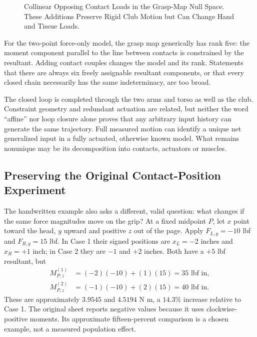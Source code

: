 \documentclass[11pt,a4paper]{article}
\newcommand{\vect}[1]{\boldsymbol{#1}}
\begin{document}
\begin{figure}[htbp]\centering
{}
\caption{Collinear Opposing Contact Loads in the Grasp-Map Null Space. These Additions Preserve Rigid Club Motion but Can Change Hand and Tissue Loads.}
\label{fig:distributed_forces}\end{figure}

For the two-point force-only model, the grasp map generically has rank five: the moment component parallel to the line between contacts is constrained by the resultant. Adding contact couples changes the model and its rank. Statements that there are always six freely assignable resultant components, or that every closed chain necessarily has the same indeterminacy, are too broad.

The closed loop is completed through the two arms and torso as well as the club. Constraint geometry and redundant actuation are related, but neither the word ``affine'' nor loop closure alone proves that any arbitrary input history can generate the same trajectory. Full measured motion can identify a unique net generalized input in a fully actuated, otherwise known model. What remains nonunique may be its decomposition into contacts, actuators or muscles.

\subsection{Preserving the Original Contact-Position Experiment}
The handwritten example also asks a different, valid question: what changes if the same force magnitudes move on the grip? At a fixed midpoint $P$, let $x$ point toward the head, $y$ upward and positive $z$ out of the page. Apply $F_{L,y}=-10$ lbf and $F_{R,y}=15$ lbf. In Case 1 their signed positions are $x_L=-2$ inches and $x_R=+1$ inch; in Case 2 they are $-1$ and $+2$ inches. Both have a $+5$ lbf resultant, but
\begin{align}
M_{P,z}^{(1)}&=(-2)(-10)+(1)(15)=35\text{ lbf in},\\
M_{P,z}^{(2)}&=(-1)(-10)+(2)(15)=40\text{ lbf in}.
\end{align}
These are approximately $3.9545$ and $4.5194$ N m, a $14.3\%$ increase relative to Case 1. The original sheet reports negative values because it uses clockwise-positive moments. Its approximate fifteen-percent comparison is a chosen example, not a measured population effect.
\end{document}
